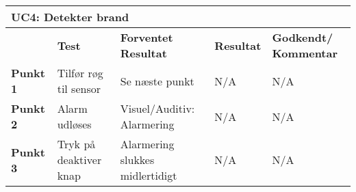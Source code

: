 \begin{table}[htbp] \centering
\begin{tabular}{|p{}|p{}|p{3cm}|p{3cm}|p{3cm}|} %
	\hline
\multicolumn{5}{|l|}{\textbf{UC4: Detekter brand}} \\\hline
&\textbf{Test} &\textbf{Forventet \newline Resultat} &\textbf{Resultat} &\textbf{Godkendt/ \newline Kommentar} \\\hline
\textbf{Punkt 1} &
Tilfør røg til sensor &
Se næste punkt &
N/A & 
N/A \\\hline
\textbf{Punkt 2} &
Alarm udløses &
Visuel/Auditiv: Alarmering &
N/A	 &
N/A \\\hline
\textbf{Punkt 3} &
Tryk på deaktiver knap &
Alarmering slukkes midlertidigt&
N/A	 &
N/A \\\hline
	\end{tabular}
	\label{ATUC4} 
\end{table}